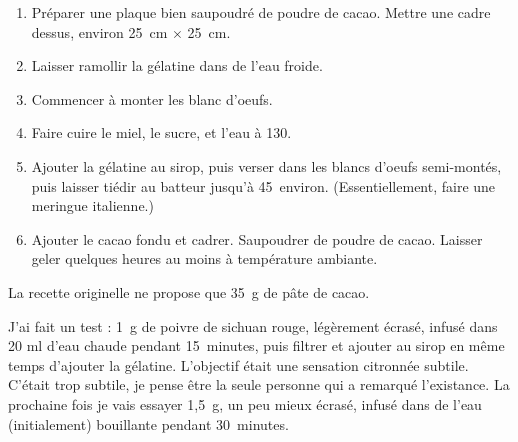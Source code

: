 
\begin{ingredients}
\end{ingredients}


\begin{recipe}
  \begin{enumerate}

  \item Préparer une plaque bien saupoudré de poudre de cacao. Mettre
    une cadre dessus, environ 25~cm$\,\times\,$25~cm.

  \item Laisser ramollir la gélatine dans de l'eau froide.

  \item Commencer à monter les blanc d'oeufs.

  \item Faire cuire le miel, le sucre, et l'eau à 130\degreeC.

  \item Ajouter la gélatine au sirop, puis verser dans les blancs
    d'oeufs semi-montés, puis laisser tiédir au batteur jusqu'à 45\degreeC\,
    environ. (Essentiellement, faire une meringue italienne.)

  \item Ajouter le cacao fondu et cadrer. Saupoudrer de poudre de
    cacao. Laisser geler quelques heures au moins à température
    ambiante.

  \end{enumerate}
\end{recipe}

La recette originelle ne propose que 35~g de pâte de cacao.

J'ai fait un test : 1~g de poivre de sichuan rouge, légèrement écrasé, infusé dans 20 ml d'eau chaude pendant 15~minutes, puis filtrer et ajouter au sirop en même temps d'ajouter la gélatine.  L'objectif était une sensation citronnée subtile.  C'était trop subtile, je pense être la seule personne qui a remarqué l'existance.  La prochaine fois je vais essayer 1,5~g, un peu mieux écrasé, infusé dans de l'eau (initialement) bouillante pendant 30~minutes.

